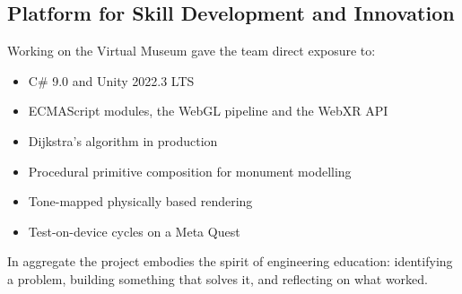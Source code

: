 \subsection{Platform for Skill Development and Innovation}

Working on the Virtual Museum gave the team direct exposure to:

\begin{itemize}
\item C\# 9.0 and Unity 2022.3 LTS
\item ECMAScript modules, the WebGL pipeline and the WebXR API
\item Dijkstra's algorithm in production
\item Procedural primitive composition for monument modelling
\item Tone-mapped physically based rendering
\item Test-on-device cycles on a Meta Quest
\end{itemize}

In aggregate the project embodies the spirit of engineering education: identifying a problem, building something that solves it, and reflecting on what worked.
